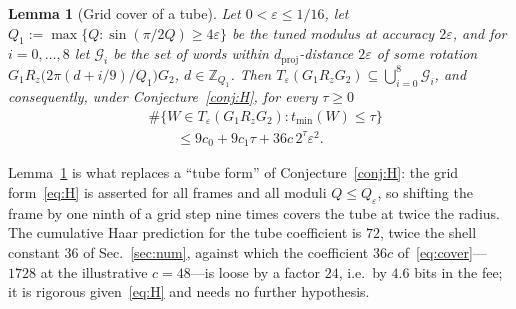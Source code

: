 \documentclass[aps,prx,twocolumn,superscriptaddress,nofootinbib,longbibliography]{revtex4-2}
\theoremstyle{plain}
\newtheorem{lemma}{Lemma}
\theoremstyle{definition}
\theoremstyle{remark}
\newcommand{\dproj}{d_{\mathrm{proj}}}
\newcommand{\Z}{\mathbb{Z}}
\begin{document}
\begin{lemma}[Grid cover of a tube]\label{lem:cover}
Let $0<\varepsilon\le1/16$, let $Q_1:=\max\{Q:\sin(\pi/2Q)\ge4\varepsilon\}$ be the tuned modulus at accuracy $2\varepsilon$, and for $i=0,\dots,8$ let $\mathcal G_i$ be the set of words within $\dproj$-distance $2\varepsilon$ of some rotation $G_1R_z\big(2\pi(d+i/9)/Q_1\big)G_2$, $d\in\Z_{Q_1}$. Then $T_\varepsilon(G_1R_zG_2)\subseteq\bigcup_{i=0}^8\mathcal G_i$, and consequently, under Conjecture~\ref{conj:H}, for every $\tau\ge0$
\begin{equation}\label{eq:cover}
\begin{aligned}
&\#\{W\in T_\varepsilon(G_1R_zG_2):t_{\min}(W)\le\tau\}\\
&\qquad\le9c_0+9c_1\tau+36c\,2^\tau\varepsilon^2.
\end{aligned}
\end{equation}
\end{lemma}
Lemma~\ref{lem:cover} is what replaces a ``tube form'' of Conjecture~\ref{conj:H}: the grid form~\eqref{eq:H} is asserted for all frames and all moduli $Q\le Q_\varepsilon$, so shifting the frame by one ninth of a grid step nine times covers the tube at twice the radius. The cumulative Haar prediction for the tube coefficient is $72$, twice the shell constant $36$ of Sec.~\ref{sec:num}, against which the coefficient $36c$ of~\eqref{eq:cover}---$1728$ at the illustrative $c=48$---is loose by a factor $24$, i.e.\ by $4.6$ bits in the fee; it is rigorous given~\eqref{eq:H} and needs no further hypothesis.
\end{document}
